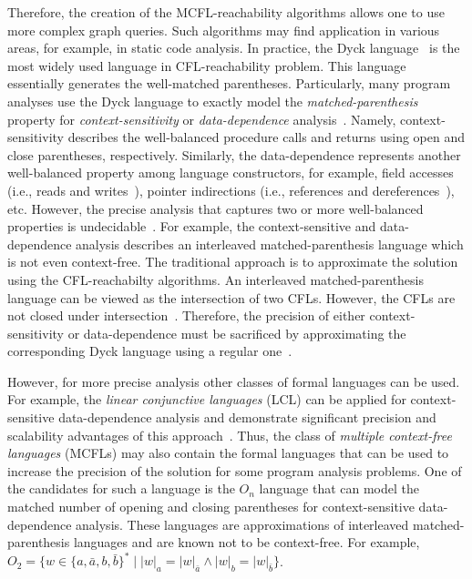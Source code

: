 Therefore, the creation of the MCFL-reachability algorithms allows one to use more complex graph queries. Such algorithms may find application in various areas, for example, in static code analysis. In practice, the Dyck language~\cite{zhang2013fast,kodumal2004set} is the most widely used language in CFL-reachability problem. This language essentially generates the well-matched parentheses. Particularly, many program analyses use the Dyck language to exactly model the \textit{matched-parenthesis} property for \textit{context-sensitivity} or \textit{data-dependence} analysis~\cite{reps2000undecidability}. Namely, context-sensitivity describes the well-balanced procedure calls and returns using open and close parentheses, respectively. Similarly, the data-dependence represents another well-balanced property among language constructors, for example, field accesses (i.e., reads and writes~\cite{bastani2015specification,yan2011demand}), pointer indirections (i.e., references and dereferences~\cite{zheng2008demand}), etc. However, the precise analysis that captures two or more well-balanced properties is undecidable~\cite{reps2000undecidability}. For example, the context-sensitive and data-dependence analysis describes an interleaved matched-parenthesis language which is not even context-free. The traditional approach is to approximate the solution using the CFL-reachabilty algorithms. An interleaved matched-parenthesis language can be viewed as the intersection of two CFLs. However, the CFLs are not closed under intersection~\cite{hopcroft2001introduction}. Therefore, the precision of either context-sensitivity or data-dependence must be sacrificed by approximating the corresponding Dyck language using a regular one~\cite{huang2015scalable,sridharan2006refinement}.

However, for more precise analysis other classes of formal languages can be used. For example, the \textit{linear conjunctive languages} (LCL) can be applied for context-sensitive data-dependence analysis and demonstrate significant precision and scalability advantages of this approach~\cite{zhang2017context}. Thus, the class of \textit{multiple context-free languages} (MCFLs) may also contain the formal languages that can be used to increase the precision of the solution for some program analysis problems. One of the candidates for such a language is the $O_n$ language that can model the matched number of opening and closing parentheses for context-sensitive data-dependence analysis. These languages are approximations of interleaved matched-parenthesis languages and are known not to be context-free. For example, $O_2 = \{w \in \{a, \bar{a}, b, \bar{b}\}^* \mid |w|_a = |w|_{\bar{a}} \wedge |w|_b = |w|_{\bar{b}}\}$.

